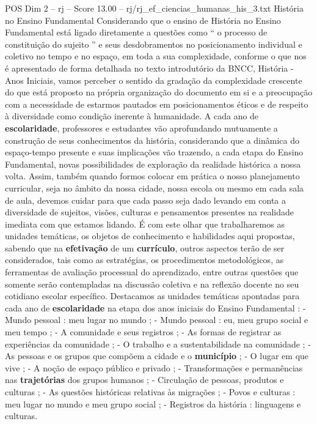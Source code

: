 \begin{textsample}{POS Dim 2 – rj – Score 13.00 – rj/rj\_ef\_ciencias\_humanas\_his\_3.txt}  \label{ex:f2_pos_240}
História no Ensino Fundamental Considerando que o ensino de História no Ensino Fundamental está ligado diretamente a questões como “ o processo de constituição do sujeito ” e seus desdobramentos no posicionamento individual e coletivo no tempo e no espaço, em toda a sua complexidade, conforme o que nos é apresentado de forma detalhada no texto introdutório da BNCC, História - Anos Iniciais, vamos perceber o sentido da gradação da complexidade crescente do que está proposto na própria organização do documento em si e a preocupação com a necessidade de estarmos pautados em posicionamentos éticos e de respeito à diversidade como condição inerente à humanidade.
A cada ano de \textbf{escolaridade}, professores e estudantes vão aprofundando mutuamente a construção de seus conhecimentos da história, considerando que a dinâmica do espaço-tempo presente e suas implicações vão trazendo, a cada etapa do Ensino Fundamental, novas possibilidades de exploração da realidade histórica a nossa volta.
Assim, também quando formos colocar em prática o nosso planejamento curricular, seja no âmbito da nossa cidade, nossa escola ou mesmo em cada sala de aula, devemos cuidar para que cada passo seja dado levando em conta a diversidade de sujeitos, visões, culturas e pensamentos presentes na realidade imediata com que estamos lidando.
É com este olhar que trabalharemos as unidades temáticas, os objetos de conhecimento e habilidades aqui propostas, sabendo que na \textbf{efetivação} de um \textbf{currículo}, outros aspectos terão de ser considerados, tais como as estratégias, os procedimentos metodológicos, as ferramentas de avaliação processual do aprendizado, entre outras questões que somente serão contempladas na discussão coletiva e na reflexão docente no seu cotidiano escolar específico.
Destacamos as unidades temáticas apontadas para cada ano de \textbf{escolaridade} na etapa dos anos iniciais do Ensino Fundamental : - Mundo pessoal : meu lugar no mundo ; - Mundo pessoal : eu, meu grupo social e meu tempo ; - A comunidade e seus registros ; - As formas de registrar as experiências da comunidade ; - O trabalho e a sustentabilidade na comunidade ; - As pessoas e os grupos que compõem a cidade e o \textbf{município} ; - O lugar em que vive ; - A noção de espaço público e privado ; - Transformações e permanências nas \textbf{trajetórias} dos grupos humanos ; - Circulação de pessoas, produtos e culturas ; - As questões históricas relativas às migrações ; - Povos e culturas : meu lugar no mundo e meu grupo social ; - Registros da história : linguagens e culturas.

\end{textsample}
